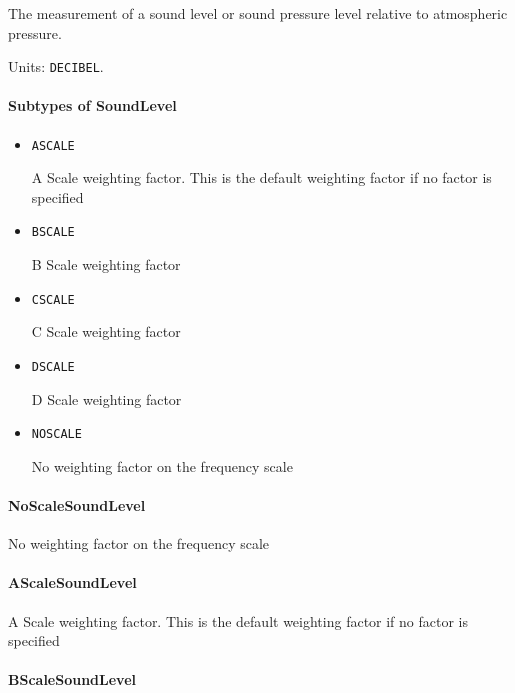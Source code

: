The measurement of a sound level or sound pressure level relative to atmospheric pressure.


Units: \texttt{DECIBEL}.

\paragraph{Subtypes of SoundLevel}\mbox{}
\label{sec:Subtypes of SoundLevel}

\begin{itemize}

\item \texttt{A\textunderscore SCALE}


A Scale weighting factor.   This is the default weighting factor if no factor is specified

\item \texttt{B\textunderscore SCALE}


B Scale weighting factor

\item \texttt{C\textunderscore SCALE}


C Scale weighting factor

\item \texttt{D\textunderscore SCALE}


D Scale weighting factor

\item \texttt{NO\textunderscore SCALE}


No weighting factor on the frequency scale


\end{itemize}

\paragraph{NoScaleSoundLevel}\mbox{}
\label{sec:NoScaleSoundLevel}


No weighting factor on the frequency scale


\paragraph{AScaleSoundLevel}\mbox{}
\label{sec:AScaleSoundLevel}


A Scale weighting factor.   This is the default weighting factor if no factor is specified


\paragraph{BScaleSoundLevel}\mbox{}
\label{sec:BScaleSoundLevel}


